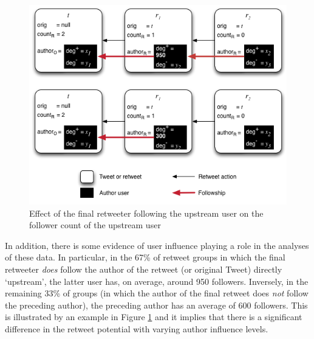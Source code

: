 \begin{figure}[h]
\centering
\includegraphics[scale=0.7]{3.Chapter1/Media/final_following_upstream.png} 
\caption{Effect of the final retweeter following the upstream user on the follower count of the upstream user}
\label{fig:final_following_upstream}
\end{figure}

In addition, there is some evidence of user influence playing a role in the analyses of these data. In particular, in the 67\% of retweet groups in which the final retweeter \textit{does} follow the author of the retweet (or original Tweet) directly `upstream', the latter user has, on average, around 950 followers. Inversely, in the remaining 33\% of groups (in which the author of the final retweet does \textit{not} follow the preceding author), the preceding author has an average of 600 followers. This is illustrated by an example in Figure \ref{fig:final_following_upstream} and it implies that there is a significant difference in the retweet potential with varying author influence levels.

